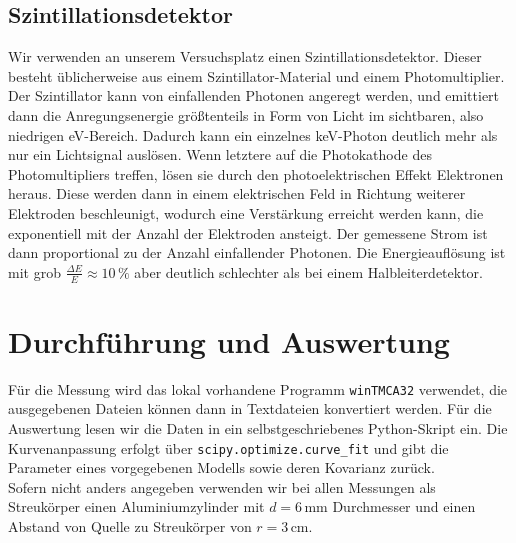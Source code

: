 \documentclass[german, parskip=full]{scrartcl}
\begin{document}
\subsection{Szintillationsdetektor}
Wir verwenden an unserem Versuchsplatz einen Szintillationsdetektor. Dieser besteht üblicherweise aus einem Szintillator-Material und einem Photomultiplier. Der Szintillator kann von einfallenden Photonen angeregt werden, und emittiert dann die Anregungsenergie größtenteils in Form von Licht im sichtbaren, also niedrigen eV-Bereich. Dadurch kann ein einzelnes keV-Photon deutlich mehr als nur ein Lichtsignal auslösen. Wenn letztere auf die Photokathode des Photomultipliers treffen, lösen sie durch den photoelektrischen Effekt Elektronen heraus. Diese werden dann in einem elektrischen Feld in Richtung weiterer Elektroden beschleunigt, wodurch eine Verstärkung erreicht werden kann, die exponentiell mit der Anzahl der Elektroden ansteigt. Der gemessene Strom ist dann proportional zu der Anzahl einfallender Photonen. Die Energieauflösung ist mit grob $\frac{\Delta E}{E}\approx 10\,\%$ aber deutlich schlechter als bei einem Halbleiterdetektor.
\section{Durchführung und Auswertung}
Für die Messung wird das lokal vorhandene Programm \texttt{winTMCA32} verwendet, die ausgegebenen Dateien können dann in Textdateien konvertiert werden. Für die Auswertung lesen wir die Daten in ein selbstgeschriebenes Python-Skript ein. Die Kurvenanpassung erfolgt über \texttt{scipy.optimize.curve{\_}fit} und gibt die Parameter eines vorgegebenen Modells sowie deren Kovarianz zurück.\\
Sofern nicht anders angegeben verwenden wir bei allen Messungen als Streukörper einen Aluminiumzylinder mit $d=6\,$mm Durchmesser und einen Abstand von Quelle zu Streukörper von $r=3\,$cm.
\end{document}
